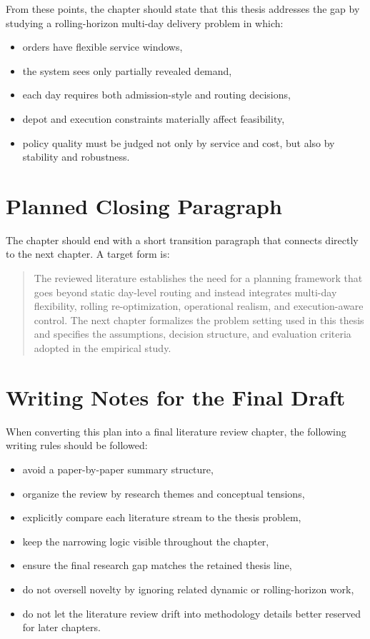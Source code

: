 From these points, the chapter should state that this thesis addresses the gap by studying a rolling-horizon multi-day delivery problem in which:

\begin{itemize}
    \item orders have flexible service windows,
    \item the system sees only partially revealed demand,
    \item each day requires both admission-style and routing decisions,
    \item depot and execution constraints materially affect feasibility,
    \item policy quality must be judged not only by service and cost, but also by stability and robustness.
\end{itemize}

\section{Planned Closing Paragraph}

The chapter should end with a short transition paragraph that connects directly to the next chapter. A target form is:

\begin{quote}
The reviewed literature establishes the need for a planning framework that goes beyond static day-level routing and instead integrates multi-day flexibility, rolling re-optimization, operational realism, and execution-aware control. The next chapter formalizes the problem setting used in this thesis and specifies the assumptions, decision structure, and evaluation criteria adopted in the empirical study.
\end{quote}

\section{Writing Notes for the Final Draft}

When converting this plan into a final literature review chapter, the following writing rules should be followed:

\begin{itemize}
    \item avoid a paper-by-paper summary structure,
    \item organize the review by research themes and conceptual tensions,
    \item explicitly compare each literature stream to the thesis problem,
    \item keep the narrowing logic visible throughout the chapter,
    \item ensure the final research gap matches the retained thesis line,
    \item do not oversell novelty by ignoring related dynamic or rolling-horizon work,
    \item do not let the literature review drift into methodology details better reserved for later chapters.
\end{itemize}

